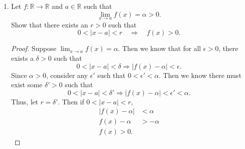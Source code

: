 \documentclass{amsart}
\newtheorem{theorem}{Theorem}
\begin{document}
\begin{enumerate}[1.]
\begin{theorem}
\begin{proof}
        Consider a closed subset $V \subseteq \mathbb{R}$ and an arbitrary function $f: X \to \mathbb{R}$. The preimage of $V$, 
        $f^{-1} (V)$ is, by definition, contained in $X$. Since every subset of $X$ is closed, then
        $f^{-1} (V)$ must also be closed. Since $V$ was chosen arbitrarily, for every closed set $V \subseteq \mathbb{R}$,  
        $f^{-1} (V)$ is also closed in $X$. Thus, $f$ is continuous. Since $f$ was chosen arbitrarily,
        all functions $f: X \to \mathbb{R}$ are continuous.
    \end{proof}
\end{theorem}
\newpage
\item  Let $f:\mathbb{R} \to \mathbb{R}$ and $a \in \mathbb{R}$ such that
\[ \lim_{x \to a} f(x) = \alpha > 0.\]
Show that there exists an $r>0$ such that 
\[ 0 < |x-a|<r \quad \Rightarrow \quad f(x) > 0.\]
\begin{proof}
    Suppose $\displaystyle \lim_{x \to a} f(x) = \alpha$. Then we know that for all $\epsilon > 0$, 
    there exists a $\delta > 0$ such that
    \[
        0 < |x - a| < \delta \Rightarrow |f(x) - \alpha| < \epsilon.    
    \]
    Since $\alpha > 0$, consider any $\epsilon'$ such that $0 < \epsilon' < \alpha$. Then we know there must exist some $\delta' > 0$ such that
    \[
        0 < |x - a| < \delta' \Rightarrow |f(x) - \alpha| < \epsilon' < \alpha.    
    \]
    Thus, let $r = \delta'$. Then if $0 < |x - a| < r$, 
    \begin{align*}
        |f(x) - \alpha| &< \alpha \\    
        f(x) - \alpha &> -\alpha \\
        f(x) > 0.
    \end{align*}
\end{proof}
\end{enumerate}
\end{document}
